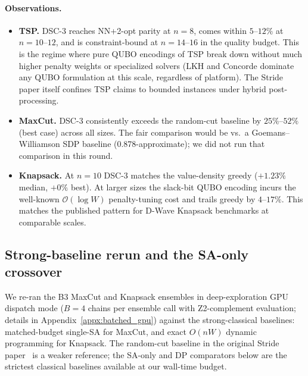 \documentclass[11pt,a4paper]{article}
\begin{document}
\paragraph{Observations.}
\begin{itemize}\itemsep0.25em
\item \textbf{TSP.} DSC-3 reaches NN+2-opt parity at $n\!=\!8$, comes within
  $5$--$12\%$ at $n\!=\!10$--$12$, and is constraint-bound at $n\!=\!14$--$16$
  in the quality budget. This is the regime where pure QUBO encodings of TSP
  break down without much higher penalty weights or specialized solvers
  (LKH and Concorde dominate any QUBO formulation at this scale, regardless
  of platform). The Stride paper itself confines TSP claims to bounded
  instances under hybrid post-processing.
\item \textbf{MaxCut.} DSC-3 consistently exceeds the random-cut baseline by
  $25\%$--$52\%$ (best case) across all sizes. The fair comparison would be
  vs.\ a Goemans--Williamson SDP baseline (0.878-approximate); we did not
  run that comparison in this round.
\item \textbf{Knapsack.} At $n\!=\!10$ DSC-3 matches the value-density
  greedy ($+1.23\%$ median, $+0\%$ best). At larger sizes the slack-bit
  QUBO encoding incurs the well-known $\mathcal{O}(\log W)$ penalty-tuning
  cost and trails greedy by $4$--$17\%$. This matches the published
  pattern for D-Wave Knapsack benchmarks at comparable scales.
\end{itemize}

\subsection{Strong-baseline rerun and the SA-only crossover}

We re-ran the B3 MaxCut and Knapsack ensembles in deep-exploration GPU
dispatch mode ($B\!=\!4$ chains per ensemble call with Z2-complement
evaluation; details in Appendix~\ref{appx:batched_gpu}) against the
strong-classical baselines: matched-budget single-SA for MaxCut, and
exact $O(nW)$ dynamic programming for Knapsack. The random-cut baseline
in the original Stride paper~\cite{booth_stride_2024} is a weaker
reference; the SA-only and DP comparators below are the strictest
classical baselines available at our wall-time budget.
\end{document}
